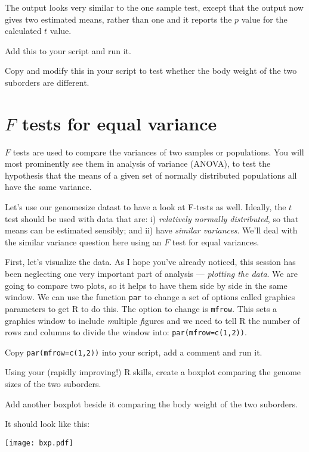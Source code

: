The output looks very similar to the one sample test, except that the 
output  now gives two estimated means, rather than one and it reports 
the $p$ value for the calculated $t$ value.

\begin{compactitem}[$\quad\star$]
\item Add this to your script and run it.
\item Copy and modify this in your script to test whether the body 
weight of the two suborders are different.
\end{compactitem}

\section{$F$ tests for equal variance}

$F$ tests are used to compare the variances of two samples or 
populations. You will most prominently see them in analysis of variance 
(ANOVA), to test the hypothesis that the means of a given set of 
normally distributed populations all have the same variance. 

Let's use our genomesize datast to have a look at F-tests as well. 
Ideally, the $t$ test should be used with data that are: i) 
\emph{relatively normally distributed}, so that means can be estimated 
sensibly; and ii) have \emph{similar variances}. We'll deal with the 
similar variance question here using an $F$ test for equal variances. 

First, let's visualize the data. As I hope you've already noticed, this 
session has been neglecting one very important part of analysis --- 
\emph{plotting the data}. We are going to compare two plots, so it 
helps to have them side by side in the same window. We can use the 
function {\tt par} to change a set of options called graphics 
parameters to get R to do this. The option to change is {\tt mfrow}. 
This sets a graphics window to include \emph{m}ultiple \emph{f}igures 
and we need to tell R the number of rows and columns to divide the 
window into: {\tt par(mfrow=c(1,2))}.
  
\begin{compactitem}[$\quad\star$]
\item Copy {\tt par(mfrow=c(1,2))} into your script, add a comment and 
run it.
\item Using your (rapidly improving!) R skills, create a boxplot comparing the 
genome sizes of the two suborders.
\item Add another boxplot beside it comparing the body weight of the 
two suborders.
\end{compactitem}
It should look like this:
\begin{center}
\texttt{[image: bxp.pdf]} 
\end{center}

